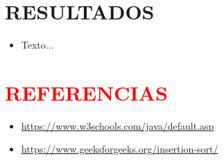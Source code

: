 \documentclass{article}
\begin{document}
	\begin{figure}[H]
	\end{figure}
	
	
	
\section{RESULTADOS}
	\begin{itemize}	
		\item Texto...
	\end{itemize}
	

\section*{\textcolor{red}{REFERENCIAS}}
\begin{itemize}			
	\item \url{https://www.w3schools.com/java/default.asp}
	\item \url{https://www.geeksforgeeks.org/insertion-sort/}
\end{itemize}	
	
%
%
%
			
\end{document}
